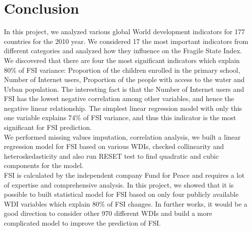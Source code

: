 \documentclass{article}
\begin{document}
\section{Conclusion}
In this project, we analyzed various global World development indicators for 177 countries for the 2010 year. We considered 17 the most important indicators from different categories and analyzed how they influence on the Fragile State Index. We discovered that there are four the most significant indicators which explain 80\% of FSI variance: Proportion of the children enrolled in the primary school, Number of Internet users, Proportion of the people with access to the water and Urban population. The interesting fact is that the Number of Internet users and FSI has the lowest negative correlation among other variables, and hence the negative linear relationship. The simplest linear regression model with only this one variable explains 74\% of FSI variance, and thus this indicator is the most significant for FSI prediction.\\

We performed missing values imputation, correlation analysis, we built a linear regression model for FSI based on various WDIs, checked collinearity and heteroskedasticity and also run RESET test to find quadratic and cubic components for the model. \\

FSI is calculated by the independent company Fund for Peace and requires a lot of expertise and comprehensive analysis. In this project, we showed that it is possible to built statistical model for FSI based on only four publicly available WDI variables which explain 80\% of FSI changes. In further works, it would be a good direction to consider other 970 different WDIs and build a more complicated model to improve the prediction of FSI.


\end{document}
